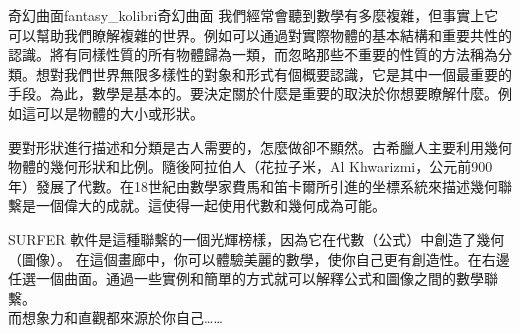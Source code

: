 \begin{surferIntroPage}{奇幻曲面}{fantasy_kolibri}{奇幻曲面}
我們經常會聽到數學有多麼複雜，但事實上它可以幫助我們瞭解複雜的世界。例如可以通過對實際物體的基本結構和重要共性的認識。將有同樣性質的所有物體歸為一類，而忽略那些不重要的性質的方法稱為分類。想對我們世界無限多樣性的對象和形式有個概要認識，它是其中一個最重要的手段。為此，數學是基本的。要決定關於什麼是重要的取決於你想要瞭解什麼。例如這可以是物體的大小或形狀。\\

\vspace{0.4cm}


要對形狀進行描述和分類是古人需要的，怎麼做卻不顯然。古希臘人主要利用幾何物體的幾何形狀和比例。隨後阿拉伯人（花拉子米，Al Khwarizmi，公元前900年）發展了代數。在18世紀由數學家費馬和笛卡爾所引進的坐標系統來描述幾何聯繫是一個偉大的成就。這使得一起使用代數和幾何成為可能。\\

\vspace{0.4cm}

 SURFER 軟件是這種聯繫的一個光輝榜樣，因為它在代數（公式）中創造了幾何（圖像）。
在這個畫廊中，你可以體驗美麗的數學，使你自己更有創造性。在右邊任選一個曲面。通過一些實例和簡單的方式就可以解釋公式和圖像之間的數學聯繫。\\
而想象力和直觀都來源於你自己……
\end{surferIntroPage}
